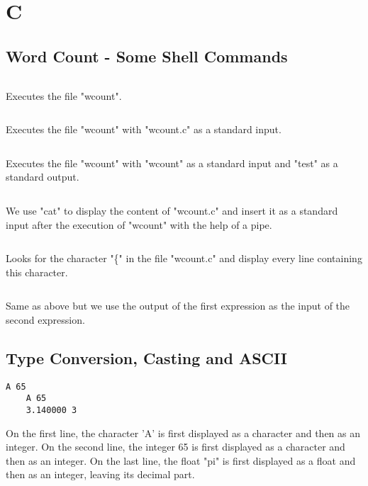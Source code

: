 \documentclass[12pt,letterpaper]{article}
\begin{document}
\section{C}

    \subsection{Word Count - Some Shell Commands} 
    
    \begin{lstlisting}[style = bash]
        % ./wcount
    \end{lstlisting}
    Executes the file "wcount".

    \begin{lstlisting}[style=bash]
        % ./wcount < wcount.c 
    \end{lstlisting}
    Executes the file "wcount" with "wcount.c" as a standard input.
    
    \begin{lstlisting}[style=bash]
        % ./wcount < wcount > test
    \end{lstlisting}
    Executes the file "wcount" with "wcount" as a standard input and "test" as a standard output.
    
    \begin{lstlisting}[style=bash]
        % cat wcount.c | ./wcount 
    \end{lstlisting}
    We use "cat" to display the content of "wcount.c" and insert it as a standard input after the execution of "wcount" with the help of a pipe.
    
    \begin{lstlisting}[style=bash]
        % grep { wcount.c  
    \end{lstlisting}
    Looks for the character "\{" in the file "wcount.c" and display every line containing this character.
    
    \begin{lstlisting}[style=bash]
        % grep { wcount.c | ./wcount
    \end{lstlisting}
    Same as above but we use the output of the first expression as the input of the second expression.
    
    \subsection{Type Conversion, Casting and ASCII}
    
    \begin{lstlisting}[style=output]
    A 65
    A 65
    3.140000 3
    \end{lstlisting}
    On the first line, the character 'A' is first displayed as a character and then as an integer.
    On the second line, the integer 65 is first displayed as a character and then as an integer.
    On the last line, the float "pi" is first displayed as a float and then as an integer, leaving its decimal part.
    
\end{document}
